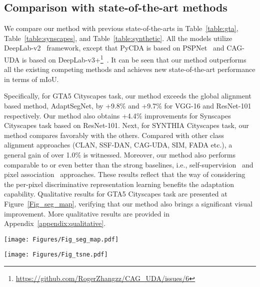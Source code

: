 \documentclass[runningheads]{llncs}
\begin{document}
\subsection{Comparison with state-of-the-art methods}
We compare our method with previous state-of-the-arts in Table~\ref{table:gta}, Table~\ref{table:synscapes}, and Table~\ref{table:synthetic}. All the models utilize DeepLab-v2~\cite{chen2018deeplab} framework, except that PyCDA is based on PSPNet~\cite{zhao2017pspnet} and CAG-UDA is based on DeepLab-v3+\footnote{\url{https://github.com/RogerZhangzz/CAG_UDA/issues/6}}~\cite{chen2018encoderdecoder}. It can be seen that our method outperforms all the existing competing methods and achieves new state-of-the-art performance in terms of mIoU. 

Specifically, for GTA5  Cityscapes task, our method exceeds the global alignment based method, AdaptSegNet, by +9.8\% and +9.7\% for VGG-16 and ResNet-101 respectively. Our method also obtains +4.4\% improvements for Synscapes  Cityscapes task based on ResNet-101. Next, for SYNTHIA  Cityscapes task, our method compares favorably with the others. Compared with other class alignment approaches (CLAN, SSF-DAN, CAG-UDA, SIM, FADA etc.), a general gain of over 1.0\% is witnessed. Moreover, our method also performs comparable to or even better than the strong baselines, i.e., self-supervision~\cite{li2019bidirectional,lian2019pycda,pan2020unsupervised,vu2019advent,zou2019confidence} and pixel association~\cite{kang2020pixel,pixmatch2021_CVPR} approaches. These results reflect that the way of considering the per-pixel discriminative representation learning benefits the adaptation capability. Qualitative results for GTA5  Cityscapes task are presented at Figure~\ref{Fig_seg_map}, verifying that our method also brings a significant visual improvement. More qualitative results are provided in Appendix~\ref{appendix:qualitative}.

\begin{figure*}
    \centering
    \texttt{[image: Figures/Fig\_seg\_map.pdf]}\caption{Qualitative results for GTA5  Cityscapes task. For each target image, we show results with global alignment (AdaptSegNet), coarse-grained class alignment (CLAN) and our method, and the ground-truth label map.}
    \label{Fig_seg_map}
    \vspace{-4mm}
\end{figure*}
\begin{figure*}
    \centering
    \texttt{[image: Figures/Fig\_tsne.pdf]}\caption{Comparisons of segmentation result and t-SNE visualization~\cite{maaten2008visualizing} between CAG-UDA~\cite{zhang2019category} and our method.}
    \label{Fig_tsne}
    \vspace{-3mm}
\end{figure*}
\end{document}
